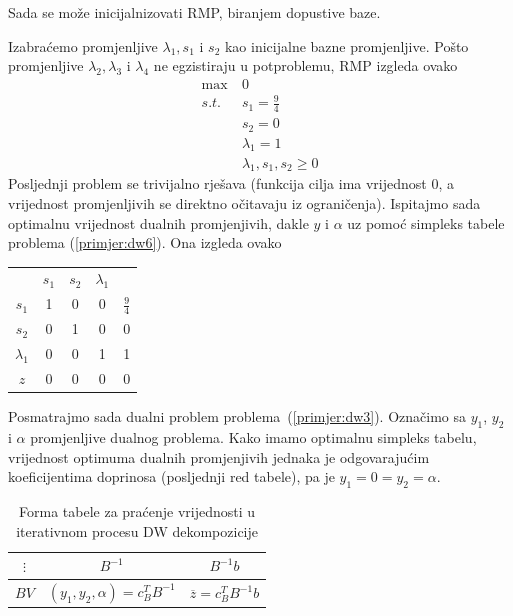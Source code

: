 \documentclass[a4paper, utf8, 11pt, colorlinks]{book}
\begin{document}
Sada se može inicijalnizovati RMP, biranjem dopustive baze.

Izabraćemo promjenljive $\lambda_1, s_1$ i $s_2$ kao inicijalne bazne promjenljive. Pošto  promjenljive $\lambda_2,\lambda_3$ i $\lambda_4$ ne egzistiraju u potproblemu,  RMP izgleda ovako
      \begin{equation}
	\begin{aligned}\label{primjer:dw6}
		\max\  & 0\\
		s.t.\  &s_1=\frac 94\\
		&s_2=0\\
		&\lambda_1 = 1\\
		&\lambda_1,s_1,s_2\geqslant 0
	\end{aligned}
\end{equation}
Posljednji problem se trivijalno rješava (funkcija cilja ima vrijednost 0, a vrijednost promjenljivih se direktno očitavaju iz ograničenja). Ispitajmo sada optimalnu vrijednost dualnih promjenjivih, dakle $y$ i $\alpha$ uz pomoć simpleks tabele problema (\ref{primjer:dw6}). Ona izgleda ovako
\begin{center}

\begin{tabular}{c|cccc}
	       &$s_1$  & $ s_2$   & $\lambda_1$ &  \\
 $s_1$	   &  1  &   0      &   0         &  $\frac{9}{4}$ \\
  $s_2$	  &  0  &    1     &   0         &  0             \\
$\lambda_1$	  &  0  &    0     &   1         &  1   \\ \hline
	$z$   & 0  &    0     &   0         &  0
\end{tabular}
\end{center}
 
Posmatrajmo sada dualni problem problema~(\ref{primjer:dw3}). Označimo sa $y_1$, $y_2$ i $\alpha$ promjenljive dualnog problema. Kako imamo optimalnu simpleks tabelu, vrijednost optimuma dualnih promjenjivih jednaka je odgovarajućim koeficijentima doprinosa (posljednji red tabele), pa je $y_1 = 0 = y_2 = \alpha$. 

\begin{table}\centering
	\begin{tabular}{|c|c|c|} \hline
	$\vdots$ & 	$B^{-1}$& $B^{-1}b$ \\
	\hline
	$BV$ &	$(y_1,y_2,\alpha)=c^T_B B^{-1}$ & $\overline{z}= c^T_B B^{-1}b$ \\	
		\hline
	\end{tabular}\caption{Forma tabele za praćenje vrijednosti u iterativnom procesu DW dekompozicije}\label{tbl:dw1}
\end{table}
\end{document}
